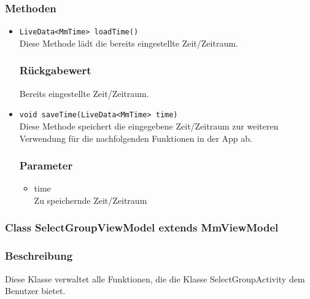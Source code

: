 \documentclass[a4paper]{scrreprt}
\begin{document}
\subsubsection*{Methoden}
\begin{addmargin}[25pt]{0pt}
\begin{itemize}

\item \texttt{LiveData<MmTime> loadTime()}\\
	Diese Methode lädt die bereits eingestellte Zeit/Zeitraum.

	\subsubsection*{Rückgabewert}
	Bereits eingestellte Zeit/Zeitraum.

\item \texttt{void saveTime(LiveData<MmTime> time)}\\
Diese Methode speichert die eingegebene Zeit/Zeitraum zur weiteren Verwendung für die nachfolgenden Funktionen in der App ab.

	\subsubsection*{Parameter}
	\begin{itemize}
	\item time \\
		Zu speichernde Zeit/Zeitraum
	\end{itemize}

\end{itemize}
\end{addmargin}


\subsubsection{Class SelectGroupViewModel extends MmViewModel}
\subsubsection*{Beschreibung}
Diese Klasse verwaltet alle Funktionen, die die Klasse SelectGroupActivity dem Benutzer bietet.
\end{document}
